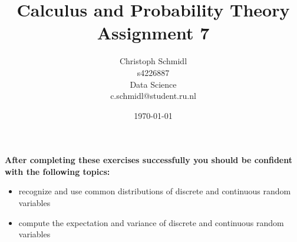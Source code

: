 \documentclass[a4paper]{article}
\title{Calculus and Probability Theory\\ Assignment 7}
\author{Christoph Schmidl\\
s4226887\\
Data Science\\
c.schmidl@student.ru.nl\\}
\date{\today}
\begin{document}
\maketitle





\textbf{After completing these exercises successfully you should be confident with the following topics:}

\begin{itemize}
	\item recognize and use common distributions of discrete and continuous random variables
	\item compute the expectation and variance of discrete and continuous random variables
\end{itemize}
\vspace{1em}
\end{document}
